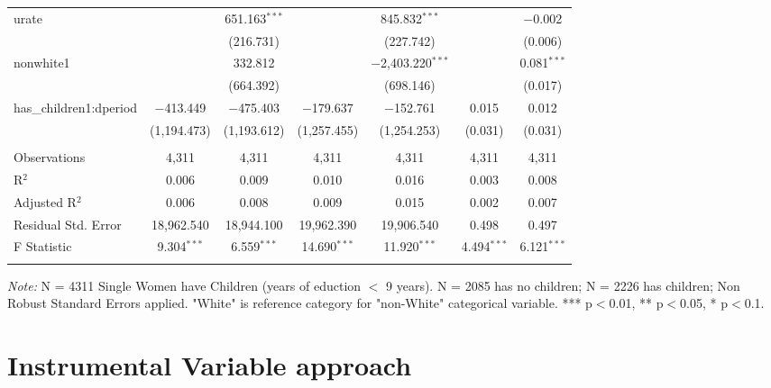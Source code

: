 \documentclass[a4paper]{article}
\begin{document}
\begin{table}[!htbp]
\begin{adjustwidth}{0.cm}{-0cm}
\begin{threeparttable}
\begin{tabular}{@{\extracolsep{-2pt}}lcccccc}
  urate &  & 651.163$^{***}$ &  & 845.832$^{***}$ &  & $-$0.002 \\ 
  &  & (216.731) &  & (227.742) &  & (0.006) \\ 
  nonwhite1 &  & 332.812 &  & $-$2,403.220$^{***}$ &  & 0.081$^{***}$ \\ 
  &  & (664.392) &  & (698.146) &  & (0.017) \\ 
  has\_children1:dperiod & $-$413.449 & $-$475.403 & $-$179.637 & $-$152.761 & 0.015 & 0.012 \\ 
  & (1,194.473) & (1,193.612) & (1,257.455) & (1,254.253) & (0.031) & (0.031) \\ 
 \hline \\[-1.8ex] 
Observations & 4,311 & 4,311 & 4,311 & 4,311 & 4,311 & 4,311 \\ 
R$^{2}$ & 0.006 & 0.009 & 0.010 & 0.016 & 0.003 & 0.008 \\ 
Adjusted R$^{2}$ & 0.006 & 0.008 & 0.009 & 0.015 & 0.002 & 0.007 \\ 
Residual Std. Error & 18,962.540 & 18,944.100 & 19,962.390  & 19,906.540  & 0.498  & 0.497 \\ 
F Statistic & 9.304$^{***}$ & 6.559$^{***}$  & 14.690$^{***}$ & 11.920$^{***}$ & 4.494$^{***}$ & 6.121$^{***}$  \\ 
\hline 
\hline \\[-3.5ex] 
\end{tabular} 
\begin{tablenotes}
      \small
      \item\textit{Note:} N = 4311 Single Women have Children (years of eduction $<$ 9 years). N = 2085 has no children; N = 2226 has children; Non Robust Standard Errors applied. "White" is reference category for "non-White" categorical variable. *** p$<$0.01, ** p$<$0.05, * p$<$0.1.
    \end{tablenotes}
\end{threeparttable}
\end{adjustwidth}
%
\end{table}

\section{Instrumental Variable approach}
\end{document}
